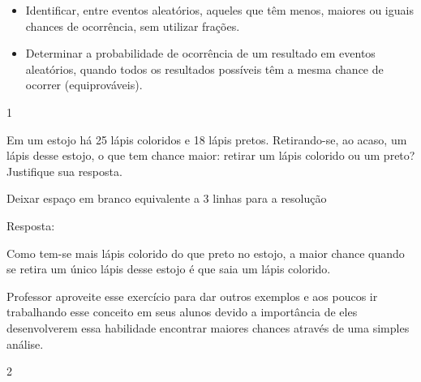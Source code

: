 \begin{escolha}
\begin{escolha}


\begin{itemize}
    \item Identificar, entre eventos aleatórios, aqueles que têm menos, maiores ou
iguais chances de ocorrência, sem utilizar frações.

    \item Determinar a probabilidade de ocorrência de um resultado em eventos
aleatórios, quando todos os resultados possíveis têm a mesma chance de
ocorrer (equiprováveis).
\end{itemize}



\num{1}

Em um estojo há 25 lápis coloridos e 18 lápis pretos. Retirando-se, ao
acaso, um lápis desse estojo, o que tem chance maior: retirar um lápis
colorido ou um preto? Justifique sua resposta.

Deixar espaço em branco equivalente a 3 linhas para a resolução

Resposta:

Como tem-se mais lápis colorido do que preto no estojo, a maior chance
quando se retira um único lápis desse estojo é que saia um lápis
colorido.

Professor aproveite esse exercício para dar outros exemplos e aos poucos
ir trabalhando esse conceito em seus alunos devido a importância de eles
desenvolverem essa habilidade encontrar maiores chances através de uma
simples análise.

\num{2}


\end{escolha}
\end{escolha}
